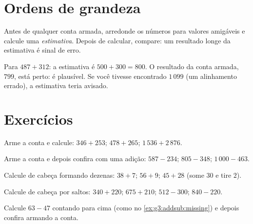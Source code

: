 \section{Ordens de grandeza}

\begin{method}\label{met:g3:addsub:estimate}
Antes de qualquer conta armada, arredonde os números para valores
amigáveis e calcule uma \emph{estimativa}. Depois de calcular,
compare: um resultado longe da estimativa é sinal de erro.
\end{method}

\begin{example}
Para $487 + 312$: a estimativa é $500 + 300 = 800$. O resultado da
conta armada, $799$, está perto: é plausível. Se você tivesse
encontrado $1\,099$ (um alinhamento errado), a estimativa teria
avisado.
\end{example}

\section{Exercícios}

\begin{exercise}[$\star$]\label{exo:g3:addsub:1}
Arme a conta e calcule: $346 + 253$; \quad $478 + 265$; \quad
$1\,536 + 2\,876$.
\end{exercise}

\begin{exercise}[$\star$]\label{exo:g3:addsub:2}
Arme a conta e depois confira com uma adição: $587 - 234$; \quad
$805 - 348$; \quad $1\,000 - 463$.
\end{exercise}

\begin{exercise}[$\star$]\label{exo:g3:addsub:3}
Calcule de cabeça formando dezenas: $38 + 7$; \quad $56 + 9$; \quad
$45 + 28$ (some $30$ e tire $2$).
\end{exercise}

\begin{exercise}[$\star$]\label{exo:g3:addsub:4}
Calcule de cabeça por saltos: $340 + 220$; \quad $675 + 210$; \quad
$512 - 300$; \quad $840 - 220$.
\end{exercise}

\begin{exercise}[$\star$]\label{exo:g3:addsub:5}
Calcule $63 - 47$ contando para cima (como no
\cref{ex:g3:addsub:missing}) e depois confira armando a conta.
\end{exercise}

